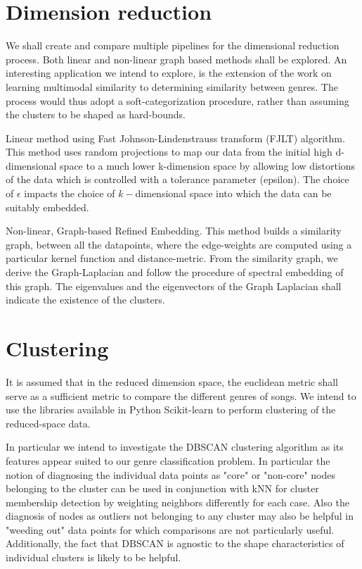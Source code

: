\documentclass[12pt]{article}
\begin{document}
\section{Dimension reduction}
We shall create and compare multiple pipelines for the dimensional reduction process. Both linear and non-linear graph based methods shall be explored. An interesting application we intend to explore, is the extension of the work on learning multimodal similarity \cite{multimodalSimilarity} to determining similarity between genres. The process would thus adopt a soft-categorization procedure, rather than assuming the clusters to be shaped as hard-bounds.

Linear method using Fast Johnson-Lindenstrauss transform (FJLT) algorithm.  This method uses random projections to map our data from the initial high d-dimensional space to a much lower k-dimension space by allowing low distortions of the data which is controlled with a tolerance parameter (epsilon). The choice of $\epsilon$ impacts the choice of $k-$dimensional space into which the data can be suitably embedded.

Non-linear, Graph-based Refined Embedding. This method builds a similarity graph, between all the datapoints, where the edge-weights are computed using a particular kernel function and distance-metric. From the similarity graph, we derive the Graph-Laplacian and follow the procedure of spectral embedding of this graph. The eigenvalues and the eigenvectors of the Graph Laplacian shall indicate the existence of the clusters. 

\section{Clustering}
It is assumed that in the reduced dimension space, the euclidean metric shall serve as a sufficient metric to compare the different genres of songs. We intend to use the libraries available in Python Scikit-learn \cite{scikitlearn} to perform clustering of the reduced-space data.

In particular we intend to investigate the DBSCAN clustering algorithm as its features appear suited to our genre classification problem.  In particular the notion of diagnosing the individual data points as "core" or "non-core" nodes belonging to the cluster can be used in conjunction with kNN for cluster membership detection by weighting neighbors differently for each case.  Also the diagnosis of nodes as outliers not belonging to any cluster may also be helpful in "weeding out" data points for which comparisons are not particularly useful.  Additionally, the fact that DBSCAN is agnostic to the shape characteristics of individual clusters is likely to be helpful.
\end{document}
